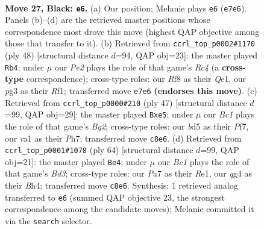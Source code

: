 \documentclass[11pt]{article}
\begin{document}
\clearpage

\begin{figure}[p]\centering
\begin{subfigure}{0.46\textwidth}\centering
\resizebox{\linewidth}{!}{%
\newchessgame
\chessboard[
  setfen={2bq1rk1/p3p1b1/Pr1p1p2/2pB1P2/2P3Q1/6P1/4N2K/R1B2R2 b - - 3 27},
  showmover=false,
  pgfstyle=straightmove, color=movearrow, markmove={e7-e6}
]}
\caption{}
\end{subfigure}\hfill
\begin{subfigure}{0.46\textwidth}\centering
\resizebox{\linewidth}{!}{%
\newchessgame
\chessboard[
  setfen={1r2r1k1/1p3pbp/p1p1b3/P1P1p1q1/2R5/3P1PP1/1B2P1B1/4QRK1 w - - 1 25},
  showmover=false,
  pgfstyle=straightmove, color=movearrow, markmove={c4-b4}
]}
\caption{}
\end{subfigure}
\\[4pt]
\begin{subfigure}{0.46\textwidth}\centering
\resizebox{\linewidth}{!}{%
\newchessgame
\chessboard[
  setfen={2r2rk1/pp3pbp/2q3p1/3nP1B1/P2R2P1/2p2N1P/P1Q5/1K3B1R b - - 3 24},
  showmover=false,
  pgfstyle=straightmove, color=movearrow, markmove={g7-e5}
]}
\caption{}
\end{subfigure}\hfill
\begin{subfigure}{0.46\textwidth}\centering
\resizebox{\linewidth}{!}{%
\newchessgame
\chessboard[
  setfen={r2r4/2pn3k/1p3ppq/p3b2p/P6B/2PB3P/1PQ3P1/4RR1K w - - 0 33},
  showmover=false,
  pgfstyle=straightmove, color=movearrow, markmove={d3-e4}
]}
\caption{}
\end{subfigure}
\caption{\textbf{Move 27, Black: \texttt{e6}.} (a) Our position; Melanie plays \texttt{e6} (\texttt{e7e6}). Panels (b)--(d) are the retrieved master positions whose correspondence most drove this move (highest QAP objective among those that transfer to it). (b) Retrieved from \texttt{ccrl\_top\_p0002\#1170} (ply 48) [structural distance $d$=94, QAP obj=23]: the master played \texttt{Rb4}; under $\mu$ our \emph{Pe2} plays the role of that game's \emph{Rc4} (a \textbf{cross-type} correspondence); cross-type roles: our \emph{R}f8 as their \emph{Q}e1, our \emph{p}g3 as their \emph{R}f1; transferred move \texttt{e7e6} \textbf{(endorses this move)}. (c) Retrieved from \texttt{ccrl\_top\_p0000\#210} (ply 47) [structural distance $d$=99, QAP obj=29]: the master played \texttt{Bxe5}; under $\mu$ our \emph{Bc1} plays the role of that game's \emph{Bg2}; cross-type roles: our \emph{b}d5 as their \emph{P}f7, our \emph{r}a1 as their \emph{P}h7; transferred move \texttt{c8e6}. (d) Retrieved from \texttt{ccrl\_top\_p0001\#1078} (ply 64) [structural distance $d$=99, QAP obj=21]: the master played \texttt{Be4}; under $\mu$ our \emph{Bc1} plays the role of that game's \emph{Bd3}; cross-type roles: our \emph{P}a7 as their \emph{R}e1, our \emph{q}g4 as their \emph{B}h4; transferred move \texttt{c8e6}. Synthesis: 1 retrieved analog transferred to \texttt{e6} (summed QAP objective 23, the strongest correspondence among the candidate moves); Melanie committed it via the \texttt{search} selector.}
\label{fig:thought-m53}
\end{figure}
\end{document}
